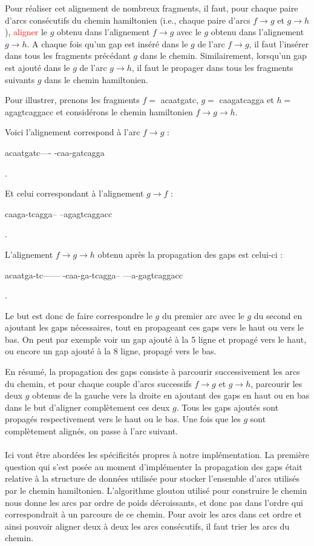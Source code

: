 \documentclass{article}
\begin{document}
Pour réaliser cet alignement de nombreux fragments, il faut, pour chaque paire d'arcs consécutifs du chemin hamiltonien (i.e., chaque paire d'arcs $f \to g$ et $g \to h$), \textcolor{red}{aligner} le $g$ obtenu dans l'alignement $f \to g$ avec le $g$ obtenu dans l'alignement $g \to h$. A chaque fois qu'un gap est inséré dans le $g$ de l'arc $f \to g$, il faut l'insérer dans tous les fragments précédant $g$ dans le chemin. Similairement, lorsqu'un gap est ajouté dans le $g$ de l'arc $g \to h$, il faut le propager dans tous les fragments suivants $g$ dans le chemin hamiltonien. 

Pour illustrer, prenons les fragments $f =$ acaatgatc, $g =$ caagatcagga et $h =$ agagtcaggacc et considérons le chemin hamiltonien $f \to g \to h$.

Voici l'alignement correspond à l'arc $f \to g$ :  
\begin{boxedverbatim}
acaatgatc----
-caa-gatcagga
\end{boxedverbatim}.

Et celui correspondant à l'alignement $g \to f$ :  
\begin{boxedverbatim}
caaga-tcagga--
--agagtcaggacc
\end{boxedverbatim}.

L'alignement $f \to g \to h$ obtenu après la propagation des gaps est celui-ci : 

\begin{boxedverbatim}
acaatga-tc------
-caa-ga-tcagga--
---a-gagtcaggacc
\end{boxedverbatim}.

Le but est donc de faire correspondre le $g$ du premier arc avec le $g$ du second en ajoutant les gaps nécessaires, tout en propageant ces gaps vers le haut ou vers le bas. On peut par exemple voir un gap ajouté à la 5 ligne et propagé vers le haut, ou encore un gap ajouté à la 8 ligne, propagé vers le bas.

En résumé, la propagation des gaps consiste à parcourir successivement les arcs du chemin, et pour chaque couple d'arcs successifs
$f \to g$ et $g \to h$, parcourir les deux $g$ obtenus de la gauche vers la droite en ajoutant des gaps en haut ou en bas dans le but d'aligner complètement ces deux $g$. Tous les gaps ajoutés sont propagés respectivement vers le haut ou le bas. Une fois que les $g$ sont complètement alignés, on passe à l'arc suivant.
\\~\\


Ici vont être abordées les spécificités propres à notre implémentation. La première question qui s'est posée au moment d'implémenter la propagation des gaps était relative à la structure de données utilisée pour stocker l'ensemble d'arcs utilisés par le chemin hamiltonien. 
L'algorithme glouton utilisé pour construire le chemin nous donne les arcs par ordre de poids décroissants, et donc pas dans l'ordre qui correspondrait à un parcours de ce chemin. Pour avoir les arcs dans cet ordre et ainsi pouvoir aligner deux à deux les arcs consécutifs, il faut trier les arcs du chemin.
\end{document}
